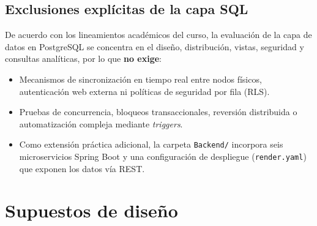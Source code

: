 \documentclass[11pt,oneside]{article}
\begin{document}
\subsection{Exclusiones expl\'icitas de la capa SQL}

De acuerdo con los lineamientos acad\'emicos del curso, la evaluaci\'on de la
capa de datos en PostgreSQL se concentra en el dise\~no, distribuci\'on, vistas,
seguridad y consultas anal\'iticas, por lo que \textbf{no exige}:

\begin{itemize}[leftmargin=1.5em, itemsep=2pt]
  \item Mecanismos de sincronizaci\'on en tiempo real entre nodos f\'isicos,
        autenticaci\'on web externa ni pol\'iticas de seguridad por fila (RLS).
  \item Pruebas de concurrencia, bloqueos transaccionales, reversi\'on
        distribuida o automatizaci\'on compleja mediante \textit{triggers}.
  \item Como extensi\'on pr\'actica adicional, la carpeta \texttt{Backend/}
        incorpora seis microservicios Spring Boot y una configuraci\'on de
        despliegue (\texttt{render.yaml}) que exponen los datos v\'ia REST.
\end{itemize}

\section{Supuestos de dise\~no}
\end{document}
